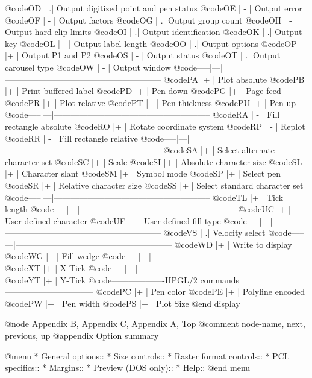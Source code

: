 @code{OD   |  .| Output digitized point and pen status}
@code{OE   | - | Output error}
@code{OF   | - | Output factors}
@code{OG   |  .| Output group count}
@code{OH   | - | Output hard-clip limits}
@code{OI   |  .| Output identification}
@code{OK   |  .| Output key}
@code{OL   | - | Output label length}
@code{OO   |  .| Output options}
@code{OP   |+  | Output P1 and P2}
@code{OS   | - | Output status}
@code{OT   |  .| Output carousel type}
@code{OW   | - | Output window}
@code{-----|---|--------------------------------------------------------}
@code{PA   |+  | Plot absolute}
@code{PB   |+  | Print buffered label}
@code{PD   |+  | Pen down}
@code{PG   |+  | Page feed}
@code{PR   |+  | Plot relative}
@code{PT   | - | Pen thickness}
@code{PU   |+  | Pen up}
@code{-----|---|--------------------------------------------------------}
@code{RA   | - | Fill rectangle absolute}
@code{RO   |+  | Rotate coordinate system}
@code{RP   | - | Replot}
@code{RR   | - | Fill rectangle relative}
@code{-----|---|--------------------------------------------------------}
@code{SA   |+  | Select alternate character set}
@code{SC   |+  | Scale}
@code{SI   |+  | Absolute character size}
@code{SL   |+  | Character slant}
@code{SM   |+  | Symbol mode}
@code{SP   |+  | Select pen}
@code{SR   |+  | Relative character size}
@code{SS   |+  | Select standard character set}
@code{-----|---|--------------------------------------------------------}
@code{TL   |+  | Tick length}
@code{-----|---|--------------------------------------------------------}
@code{UC   |+  | User-defined character}
@code{UF   | - | User-defined fill type}
@code{-----|---|--------------------------------------------------------}
@code{VS   |  .| Velocity select}
@code{-----|---|--------------------------------------------------------}
@code{WD   |+  | Write to display}
@code{WG   | - | Fill wedge}
@code{-----|---|--------------------------------------------------------}
@code{XT   |+  | X-Tick}
@code{-----|---|--------------------------------------------------------}
@code{YT   |+  | Y-Tick}
@code{-------------------HPGL/2 commands--------------------------------}
@code{PC   |+  | Pen color}
@code{PE   |+  | Polyline encoded}
@code{PW   |+  | Pen width}
@code{PS   |+  | Plot Size}
@end display



@node Appendix B, Appendix C, Appendix A, Top
@comment  node-name,  next,  previous,  up
@appendix   Option summary

@menu
* General options::
* Size controls::
* Raster format controls::
* PCL specifics::
* Margins::
* Preview (DOS only)::
* Help::
@end menu

